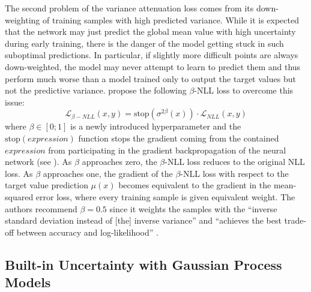\newpar The second problem of the variance attenuation loss comes from its down-weighting of training samples with high predicted variance. While it is expected that the network may just predict the global mean value with high uncertainty during early training, there is the danger of the model getting stuck in such suboptimal predictions. In particular, if slightly more difficult points are always down-weighted, the model may never attempt to learn to predict them and thus perform much worse than a model trained only to output the target values but not the predictive variance. \textcite{beta-nll-2022} propose the following $\beta$-NLL loss to overcome this issue:
\begin{equation}
    \mathcal{L}_{\beta-NLL}(x, y) = \text{stop}(\sigma^{2 \beta}(x)) \cdot \mathcal{L}_{NLL}(x, y) \label{eq:beta-nll-loss}
\end{equation}
where $\beta \in [0; 1]$ is a newly introduced hyperparameter and the $\text{stop}(expression)$ function stops the gradient coming from the contained $expression$ from participating in the gradient backpropagation of the neural network (see ). As $\beta$ approaches zero, the $\beta$-NLL loss reduces to the original NLL loss. As $\beta$ approaches one, the gradient of the $\beta$-NLL loss with respect to the target value prediction $\mu(x)$ becomes equivalent to the gradient in the mean-squared error loss, where every training sample is given equivalent weight. The authors recommend $\beta = 0.5$ since it weights the samples with the ``inverse standard deviation instead of [the] inverse variance'' \cite{beta-nll-2022} and ``achieves the best trade-off between accuracy and log-likelihood'' \cite{beta-nll-2022}.

\subsection{Built-in Uncertainty with Gaussian Process Models} \label{txt:gaussian-process}

